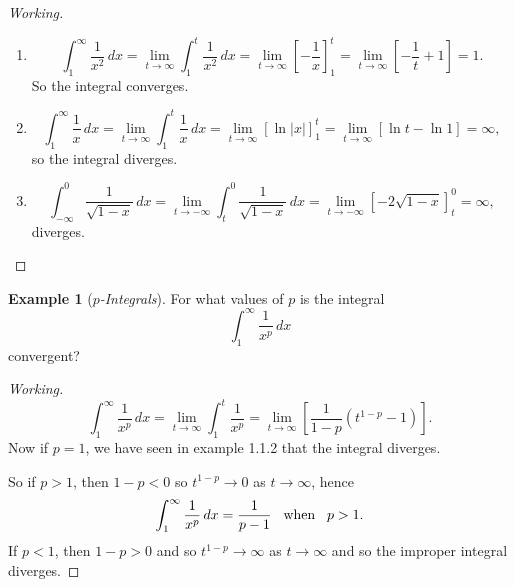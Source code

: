 \documentclass[12pt,a4paper]{report}
\theoremstyle{definition}
\newtheorem{exa}[thm]{Example}
\theoremstyle{plain}
\begin{document}
\begin{proof}[Working]
\begin{enumerate}
\item[(a).] $$\int^{\infty}_1\frac{1}{x^2}\, dx  = \lim_{t\rightarrow \infty} \int_1^t\frac{1}{x^2}\, dx  = \lim_{t\rightarrow \infty}\left[-\frac{1}{x}\right]_1^t = \lim_{t\rightarrow \infty}\left[-\frac{1}{t} + 1\right] = 1.$$ So the integral converges.


\item[(b).] $$\int_1^{\infty}\frac{1}{x}\, dx = \lim_{t\rightarrow \infty} \int_1^t\frac{1}{x}\, dx = \lim_{t\rightarrow \infty} \left[\ln |x|\right]_1^t = \lim_{t\rightarrow \infty}[\ln t - \ln 1] = \infty,$$
so the integral diverges.


\item[(c).] $$\int_{-\infty}^0\frac{1}{\sqrt{1 - x}}\, dx = \lim_{t\rightarrow -\infty}\int_t^0\frac{1}{\sqrt{1 - x}}\, dx = \lim_{t\rightarrow -\infty}\left[-2\sqrt{1 - x}\right]_t^0 = \infty,$$
diverges.
\end{enumerate}
\end{proof}



\begin{exa}[\textit{$p$-Integrals}]
For what values of $p$ is the integral $$\int_1^{\infty}\frac{1}{x^p}\, dx$$ convergent?
\end{exa}

\begin{proof}[Working]
$$\int_1^{\infty}\frac{1}{x^p}\, dx = \lim_{t\rightarrow \infty}\int_1^t\frac{1}{x^p} = \lim_{t\rightarrow \infty}\left[\frac{1}{1 - p}(t^{1 - p} - 1)\right].$$
Now if $p = 1$, we have seen in example 1.1.2 that the integral diverges. 

So if $p>1$, then $1 - p < 0$ so $t^{1-p}\longrightarrow 0$ as $t\longrightarrow \infty$, hence
$$\int_1^{\infty}\frac{1}{x^p}\, dx = \frac{1}{p - 1}\hspace{0.3cm} \text{when}\hspace{0.3cm} p>1.$$
If $p < 1$, then $1 - p > 0$ and so $t^{1 - p}\longrightarrow \infty$ as $t\longrightarrow \infty$ and so the improper integral diverges.
\end{proof}
\end{document}
